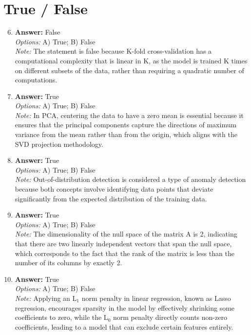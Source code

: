 \documentclass[12pt]{article}
\begin{document}
\section*{True / False}
\begin{enumerate}[label=\arabic*.]
\setcounter{enumi}{5}
\item \textbf{Answer:} False
\\ \textit{Options:} A) True; B) False
\\ \textit{Note:} The statement is false because K-fold cross-validation has a computational complexity that is linear in K, as the model is trained K times on different subsets of the data, rather than requiring a quadratic number of computations.
\item \textbf{Answer:} True
\\ \textit{Options:} A) True; B) False
\\ \textit{Note:} In PCA, centering the data to have a zero mean is essential because it ensures that the principal components capture the directions of maximum variance from the mean rather than from the origin, which aligns with the SVD projection methodology.
\item \textbf{Answer:} True
\\ \textit{Options:} A) True; B) False
\\ \textit{Note:} Out-of-distribution detection is considered a type of anomaly detection because both concepts involve identifying data points that deviate significantly from the expected distribution of the training data.
\item \textbf{Answer:} True
\\ \textit{Options:} A) True; B) False
\\ \textit{Note:} The dimensionality of the null space of the matrix A is 2, indicating that there are two linearly independent vectors that span the null space, which corresponds to the fact that the rank of the matrix is less than the number of its columns by exactly 2.
\item \textbf{Answer:} True
\\ \textit{Options:} A) True; B) False
\\ \textit{Note:} Applying an L$_{1}$ norm penalty in linear regression, known as Lasso regression, encourages sparsity in the model by effectively shrinking some coefficients to zero, while the L$_{0}$ norm penalty directly counts non-zero coefficients, leading to a model that can exclude certain features entirely.
\end{enumerate}
\end{document}
